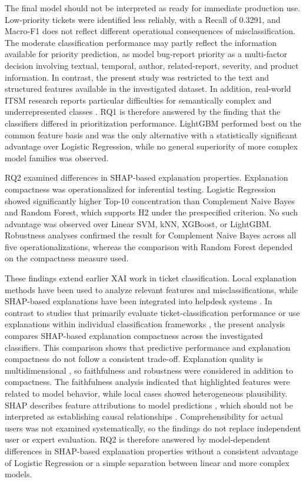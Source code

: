 The final model should not be interpreted as ready for immediate production
use. Low-priority tickets were identified less reliably, with a Recall of
0.3291, and Macro-F1 does not reflect different operational consequences of
misclassification. The moderate classification performance may partly reflect the information
available for priority prediction, as \citet{tian2015priority} model
bug-report priority as a multi-factor decision involving textual, temporal,
author, related-report, severity, and product information. In contrast, the
present study was restricted to the text and structured features available in
the investigated dataset. In addition, real-world ITSM research reports
particular difficulties for semantically complex and underrepresented classes
\cite{razma2026classification}. RQ1 is therefore answered by the finding that the
classifiers differed in prioritization performance. LightGBM performed best
on the common feature basis and was the only alternative with a statistically
significant advantage over Logistic Regression, while no general superiority
of more complex model families was observed.

RQ2 examined differences in SHAP-based explanation properties. Explanation
compactness was operationalized for inferential testing. Logistic Regression
showed significantly higher Top-10 concentration than Complement Naive Bayes
and Random Forest, which supports H2 under the prespecified criterion. No such
advantage was observed over Linear SVM, kNN, XGBoost, or LightGBM.
Robustness analyses confirmed the result for Complement Naive Bayes across all
five operationalizations, whereas the comparison with Random Forest depended
on the compactness measure used.

These findings extend earlier XAI work in ticket classification. Local
explanation methods have been used to analyze relevant features and
misclassifications, while SHAP-based explanations have been integrated into
helpdesk systems \cite{zicari2022ticket,licina2026helpagent}. In contrast to studies that primarily evaluate ticket-classification performance
or use explanations within individual classification frameworks \cite{razma2026classification,zicari2022ticket,licina2026helpagent}, the present
analysis compares SHAP-based explanation compactness across the investigated
classifiers. This comparison shows that predictive performance and explanation compactness
do not follow a consistent trade-off. Explanation quality is multidimensional
\cite{nauta2023evaluation}, so faithfulness and robustness were considered in
addition to compactness. The faithfulness analysis indicated that highlighted
features were related to model behavior, while local cases showed
heterogeneous plausibility. SHAP describes feature attributions to model predictions
\cite{lundberg2017shap}, which should not be interpreted as establishing
causal relationships \cite{janzing2020causal}. Comprehensibility for
actual users was not examined systematically, so the findings do not replace
independent user or expert evaluation. RQ2 is therefore answered by
model-dependent differences in SHAP-based explanation properties without a
consistent advantage of Logistic Regression or a simple separation between
linear and more complex models.

